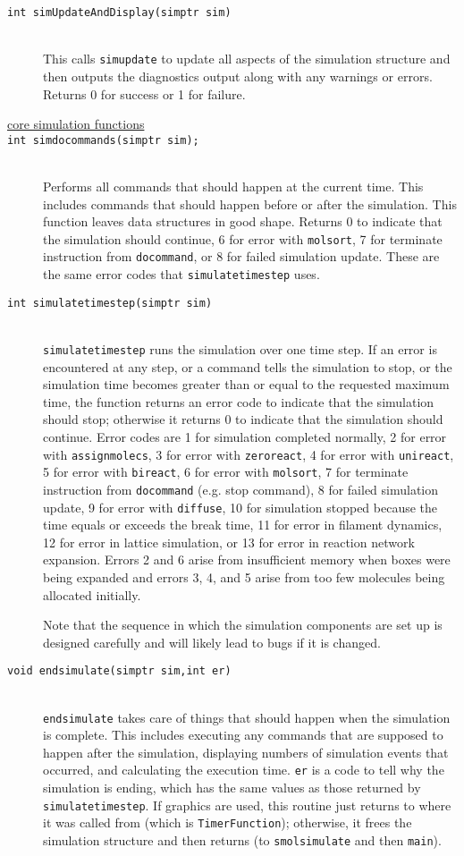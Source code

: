 \documentclass {book}
\newcommand {\ttt} {\texttt}
\begin{document}
\begin{description}
\item[\ttt{int simUpdateAndDisplay(simptr sim)}]
\hfill \\
This calls \ttt{simupdate} to update all aspects of the simulation structure and then outputs the diagnostics output along with any warnings or errors. Returns 0 for success or 1 for failure.

\item[\underline{core simulation functions}]

\item[\ttt{int simdocommands(simptr sim);}]
\hfill \\
Performs all commands that should happen at the current time. This includes commands that should happen before or after the simulation. This function leaves data structures in good shape. Returns 0 to indicate that the simulation should continue, 6 for error with \ttt{molsort}, 7 for terminate instruction from \ttt{docommand}, or 8 for failed simulation update. These are the same error codes that \ttt{simulatetimestep} uses.

\item[\ttt{int simulatetimestep(simptr sim)}]
\hfill \\
\ttt{simulatetimestep} runs the simulation over one time step. If an error is encountered at any step, or a command tells the simulation to stop, or the simulation time becomes greater than or equal to the requested maximum time, the function returns an error code to indicate that the simulation should stop; otherwise it returns 0 to indicate that the simulation should continue. Error codes are 1 for simulation completed normally, 2 for error with \ttt{assignmolecs}, 3 for error with \ttt{zeroreact}, 4 for error with \ttt{unireact}, 5 for error with \ttt{bireact}, 6 for error with \ttt{molsort}, 7 for terminate instruction from \ttt{docommand} (e.g. stop command), 8 for failed simulation update, 9 for error with \ttt{diffuse}, 10 for simulation stopped because the time equals or exceeds the break time, 11 for error in filament dynamics, 12 for error in lattice simulation, or 13 for error in reaction network expansion. Errors 2 and 6 arise from insufficient memory when boxes were being expanded and errors 3, 4, and 5 arise from too few molecules being allocated initially.

Note that the sequence in which the simulation components are set up is designed carefully and will likely lead to bugs if it is changed.

\item[\ttt{void endsimulate(simptr sim,int er)}]
\hfill \\
\ttt{endsimulate} takes care of things that should happen when the simulation is complete. This includes executing any commands that are supposed to happen after the simulation, displaying numbers of simulation events that occurred, and calculating the execution time. \ttt{er} is a code to tell why the simulation is ending, which has the same values as those returned by \ttt{simulatetimestep}. If graphics are used, this routine just returns to where it was called from (which is \ttt{TimerFunction}); otherwise, it frees the simulation structure and then returns (to \ttt{smolsimulate} and then \ttt{main}).


\end{description}
\end{document}

